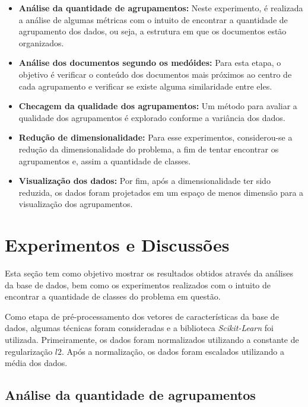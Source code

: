 \documentclass[conference]{IEEEtran}
\begin{document}
\begin{itemize}
	\item \small \textbf{Análise da quantidade de agrupamentos:} Neste experimento, é realizada a análise de algumas métricas com o intuito de encontrar a quantidade de agrupamento dos dados, ou seja, a estrutura em que os documentos estão organizados.
	
	\item \small \textbf{Análise dos documentos segundo os medóides:} Para esta etapa, o objetivo é verificar o conteúdo dos documentos mais próximos ao centro de cada agrupamento e verificar se existe alguma similaridade entre eles.  
	
	\item \small \textbf{Checagem da qualidade dos agrupamentos:} Um método para avaliar a qualidade dos agrupamentos é explorado conforme a variância dos dados.
	
	\item \small \textbf{Redução de dimensionalidade:} Para esse experimentos, considerou-se a redução da dimensionalidade do problema, a fim de tentar encontrar os agrupamentos e, assim a quantidade de classes.
	
	\item \small \textbf{Visualização dos dados:} Por fim, após a dimensionalidade ter sido reduzida, os dados foram projetados em um espaço de menos dimensão para a visualização dos agrupamentos.
	
\end{itemize}

\section{Experimentos e Discussões} \label{sec:exp}

Esta seção tem como objetivo mostrar os resultados obtidos através da análises da base de dados, bem como os experimentos realizados com o intuito de encontrar a quantidade de classes do problema em questão. 

Como etapa de pré-processamento dos vetores de características da base de dados, algumas técnicas foram consideradas e a biblioteca \emph{Scikit-Learn} foi utilizada. Primeiramente, os dados foram normalizados utilizando a constante de regularização $l2$. Após a normalização, os dados foram escalados utilizando a média dos dados. 

\subsection{Análise da quantidade de agrupamentos}
\end{document}

